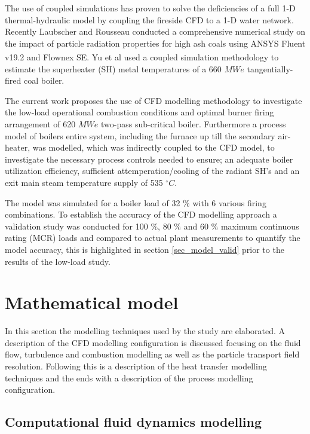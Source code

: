 \documentclass[review]{elsarticle}
\begin{document}
The use of coupled simulations has proven to solve the deficiencies of a full 1-D thermal-hydraulic model by coupling the fireside CFD to a 1-D water network. Recently Laubscher and Rousseau \cite{Laubscher2020} conducted a comprehensive numerical study on the impact of particle radiation properties for high ash coals using ANSYS Fluent v19.2\textsuperscript{\textregistered} and Flownex SE\textsuperscript{\textregistered}. Yu et al \cite{Yu2019} used a coupled simulation methodology to estimate the superheater (SH) metal temperatures of a 660 $MWe$ tangentially-fired coal boiler.

The current work proposes the use of CFD modelling methodology to investigate the low-load operational combustion conditions and optimal burner firing arrangement of 620 $MWe$ two-pass sub-critical boiler. Furthermore a process model of boilers entire system, including the furnace up till the secondary air-heater, was modelled, which was indirectly coupled to the CFD model, to investigate the necessary process controls needed to ensure; an adequate boiler utilization efficiency, sufficient attemperation/cooling of the radiant SH's and an exit main steam temperature supply of 535 $^\circ C$. 

The model was simulated for a boiler load of 32 $\%$  with 6 various firing combinations. To establish the accuracy of the CFD modelling approach a validation study was conducted for 100 $\%$, 80 $\%$ and 60 $\%$ maximum continuous rating (MCR) loads and compared to actual plant measurements to quantify the model accuracy, this is highlighted in section \ref{sec_model_valid} prior to the results of the low-load study. 

\section{Mathematical model}
In this section the modelling techniques used by the study are elaborated. A description of the CFD modelling configuration is discussed focusing on the fluid flow, turbulence and combustion modelling as well as the particle transport field resolution. Following this is a description of the heat transfer modelling techniques and the ends with a description of the process modelling configuration.
\subsection{Computational fluid dynamics modelling}
\end{document}
